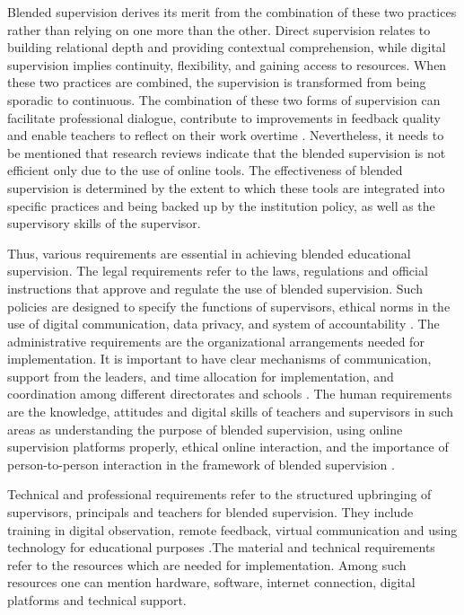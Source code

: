 \documentclass[10pt]{NSP1}
\begin{document}
Blended supervision derives its merit from the combination of these two practices rather than relying on one more than the other. Direct supervision relates to building relational depth and providing contextual comprehension, while digital supervision implies continuity, flexibility, and gaining access to resources. When these two practices are combined, the supervision is transformed from being sporadic to continuous. The combination of these two forms of supervision can facilitate professional dialogue, contribute to improvements in feedback quality and enable teachers to reflect on their work overtime \cite{ref16}. Nevertheless, it needs to be mentioned that research reviews indicate that the blended supervision is not efficient only due to the use of online tools. The effectiveness of blended supervision is determined by the extent to which these tools are integrated into specific practices and being backed up by the institution policy, as well as the supervisory skills of the supervisor.

Thus, various requirements are essential in achieving blended educational supervision. The legal requirements refer to the laws, regulations and official instructions that approve and regulate the use of blended supervision. Such policies are designed to specify the functions of supervisors, ethical norms in the use of digital communication, data privacy, and system of accountability \cite{ref12}. The administrative requirements are the organizational arrangements needed for implementation. It is important to have clear mechanisms of communication, support from the leaders, and time allocation for implementation, and coordination among different directorates and schools \cite{ref17}. The human requirements are the knowledge, attitudes and digital skills of teachers and supervisors in such areas as understanding the purpose of blended supervision, using online supervision platforms properly, ethical online interaction, and the importance of person-to-person interaction in the framework of blended supervision \cite{ref18}.

Technical and professional requirements refer to the structured upbringing of supervisors, principals and teachers for blended supervision. They include training in digital observation, remote feedback, virtual communication and using technology for educational purposes \cite{ref19}.The material and technical requirements refer to the resources which are needed for implementation. Among such resources one can mention hardware, software, internet connection, digital platforms and technical support.
\end{document}
